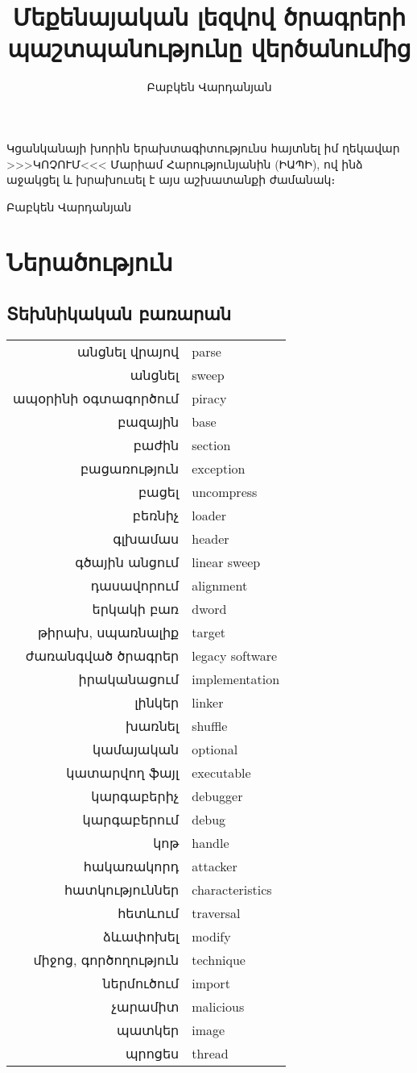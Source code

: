 \documentclass[10pt]{article}
\author{Բաբկեն Վարդանյան}
\title{Մեքենայական լեզվով ծրագրերի պաշտպանությունը վերծանումից}
\begin{document}
\setcounter{page}{2}
Կցանկանայի խորին երախտագիտությունս հայտնել իմ ղեկավար >>>ԿՈՉՈՒՄ<<<
Մարիամ Հարությունյանին (ԻԱՊԻ), ով ինձ աջակցել և խրախուսել է այս աշխատանքի
ժամանակ։

\hfill \hfill Բաբկեն Վարդանյան

\newpage

\tableofcontents

\section{Ներածություն}
\begin{sloppypar}
\subsection{Տեխնիկական բառարան}

\begin{tabular}{rl}
անցնել վրայով&parse \\
անցնել&sweep \\
ապօրինի օգտագործում&piracy \\
բազային&base \\
բաժին&section \\
բացառություն&exception \\
բացել&uncompress \\
բեռնիչ&loader \\
գլխամաս&header \\
գծային անցում&linear sweep \\
դասավորում&alignment \\
երկակի բառ&dword \\
թիրախ, սպառնալիք&target \\
ժառանգված ծրագրեր&legacy software \\
իրականացում&implementation \\
լինկեր&linker \\
խառնել&shuffle \\
կամայական&optional \\
կատարվող ֆայլ&executable \\
կարգաբերիչ&debugger \\
կարգաբերում&debug \\
կոթ&handle \\
հակառակորդ&attacker \\
հատկություններ&characteristics \\
հետևում&traversal \\
ձևափոխել&modify \\
միջոց, գործողություն&technique \\
ներմուծում&import \\
չարամիտ&malicious \\
պատկեր&image \\
պրոցես&thread \\
\end{tabular}


\end{sloppypar}
\end{document}
